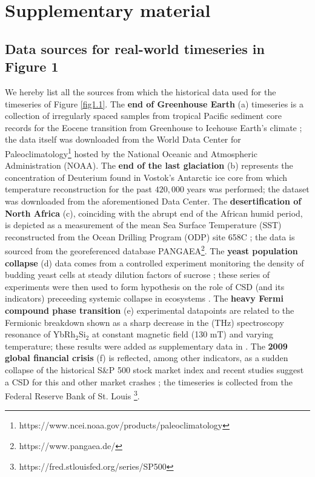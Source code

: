 \documentclass[../main.tex]{subfiles}
\begin{document}
\section{Supplementary material}\label{Supp}
\subsection{Data sources for real-world timeseries in Figure 1}\label{S1}
We hereby list all the sources from which the historical data used for the timeseries of Figure \ref{fig1.1}. The \textbf{end of Greenhouse Earth} (a) timeseries is a collection of irregularly spaced samples from tropical Pacific sediment core records for the Eocene transition from Greenhouse to Icehouse Earth's climate \cite{Tripati05}; 
the data itself was downloaded from the World Data Center for Paleoclimatology\footnote[1]{https://www.ncei.noaa.gov/products/paleoclimatology} hosted by the National Oceanic and Atmospheric Administration (NOAA).
The \textbf{end of the last glaciation} (b) represents the concentration of Deuterium found in Vostok's Antarctic ice core \cite{Petit01} from which temperature reconstruction for the past $420,000$ years was performed; the dataset was downloaded from the aforementioned Data Center\footnotemark[1].
The \textbf{desertification of North Africa} (c), coinciding with the abrupt end of the African humid period, is depicted as a measurement of the mean Sea Surface Temperature (SST) reconstructed from the Ocean Drilling Program (ODP) site 658C \cite{deMonecal00}; the data is sourced from the georeferenced database PANGAEA\footnote[2]{https://www.pangaea.de/}.
The \textbf{yeast population collapse} (d) data comes from a controlled experiment monitoring the density of budding yeast cells at steady dilution factors of sucrose \cite{Dai12}; these series of experiments were then used to form hypothesis on the role of CSD (and its indicators) preceeding systemic collapse in ecosystems \cite{Proverbio23}.
The \textbf{heavy Fermi compound phase transition} (e) experimental datapoints are related to the Fermionic breakdown shown as a sharp decrease in the (THz) spectroscopy resonance of YbRh$_2$Si$_2$ at constant magnetic field (130 mT) and varying temperature; these results were added as supplementary data in \cite{Yang23}.
The \textbf{2009 global financial crisis} (f) is reflected, among other indicators, as a sudden collapse of the historical S\&P 500 stock market index and recent studies \cite{Dmitriev17,Diks18} suggest a CSD for this and other market crashes \cite{Vandewalle98}; the timeseries is collected from the Federal Reserve Bank of St. Louis \footnote[3]{https://fred.stlouisfed.org/series/SP500}.
\end{document}
